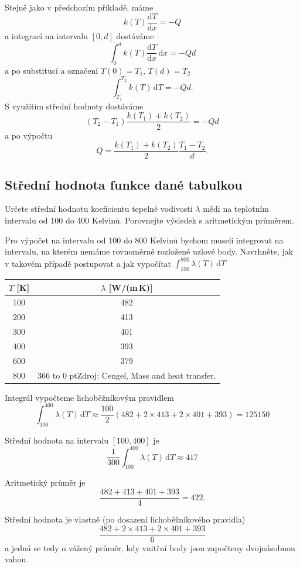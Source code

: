 \reseni
Stejně jako v předchozím příkladě, máme
$$k(T)\frac{\mathrm dT}{\mathrm dx}=-Q$$
a integrací na intervalu $[0,d]$ dostáváme
$$\int_0^d k(T)\frac{\mathrm dT}{\mathrm dx}\,\mathrm dx=-Qd$$
a po substituci a označení $T(0)=T_1$, $T(d)=T_2$
$$\int_{T_1}^{T_2} k(T)\,{\mathrm dT}=-Qd.$$
S využitím střední hodnoty dostáváme
$$(T_2-T_1)\frac{k (T_1)+k (T_2)}2=-Qd$$
a po výpočtu
$$Q=\frac{k (T_1)+k (T_2)}{2}\frac{T_1-T_2}{d}.$$




\konec


\subsection{Střední hodnota funkce dané tabulkou}

Určete střední hodnotu koeficientu tepelné vodivosti $\lambda$ mědi na teplotním intervalu od 100 do 400 Kelvinů. Porovnejte výsledek s aritmetickým průměrem.

Pro výpočet na intervalu od 100 do 800 Kelvinů bychom museli integrovat na intervalu, na kterém nemáme rovnoměrně rozložené uzlové body. Navrhněte, jak v takovém případě postupovat a jak vypočítat $\int_{100}^{800}\lambda(T)\,\mathrm dT$

{\centering 
\begin{tabular}{cc}
  $T$ [K] & $\lambda$ [W/(m\,K)]\\
  \hline
  100 & 482 \\
  200 & 413 \\
  300 & 401 \\
  400 & 393 \\
  600 & 379 \\
  800 & 366 \hbox to 0 pt{{\footnotesize \quad Zdroj: Cengel, Mass and heat transfer.}\hss}\\
\end{tabular}



}


\reseni

Integrál vypočteme lichoběžníkovým pravidlem
$$\int_{100}^{400}\lambda(T)\,\mathrm dT\approx
\frac {100}2(482+2\times 413+2\times401+393)=125150$$

Střední hodnota na intervalu $[100,400]$ je
$$\frac{1}{300}\int_{100}^{400}\lambda(T)\,\mathrm dT \approx 417$$

Aritmetický průměr je
$$\frac{482+413+401+393}4=422.$$

Střední hodnota je vlastně (po dosazení lichoběžníkového pravidla)
$$\frac {482+2\times 413+2\times401+393}6$$
a jedná se tedy o vážený průměr, kdy vnitřní body jsou započteny dvojnásobnou vahou.


